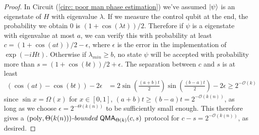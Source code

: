\documentclass[a4paper,UKenglish]{lipics-v2016}
\newcommand\QMA{{\sf{QMA}}}
\newcommand\bddQMA[5]{{\left(#1,#2\right)}\textit{-bounded }\QMA_{#3}(#4,#5)}
\DeclareMathOperator{\poly}{poly}
\begin{document}
\begin{proof}
In Circuit (\ref{circ: poor man phase estimation}) we've assumed ${\left\vert{\psi}\right\rangle}$ is an eigenstate of $H$ with eigenvalue $\lambda$. If we measure the control qubit at the end, the probability we obtain 0 is $(1+\cos(\lambda t))/2$. Therefore if $\psi$ is a eigenstate with eigenvalue at most $a$, we can verify this with probability at least $c=(1+\cos(at))/2 - \epsilon$, where $\epsilon$ is the error in the implementation of $\exp(-iHt)$. Otherwise if $\lambda_{min} \ge b$, no state $\psi$ will be accepted with probability more than $s=(1+\cos(bt))/2 + \epsilon$. The separation between $c$ and $s$ is at least 
\begin{align}
(\cos(at)-\cos(bt)) - 2\epsilon &= 2 \sin \left(\frac{(a+b)t}{2}\right) \sin \left(\frac{(b-a)t}{2}\right) - 2\epsilon \ge 2^{-\mathcal{O}(k)}
\end{align}
since $\sin x = \Omega(x)$ for $x \in [0,1]$, $(a+b)t \ge (b-a)t = 2^{-\mathcal{O}(k(n))}$, as long as we choose $\epsilon = 2^{-\Theta(k(n))}$ to be sufficiently small enough. This therefore gives a $\bddQMA{\poly}{\Theta(k(n))}{\Theta(k)}{c}{s}$ protocol for $c - s = 2^{-\mathcal{O}(k(n))}$, as desired.
\end{proof}
\end{document}
